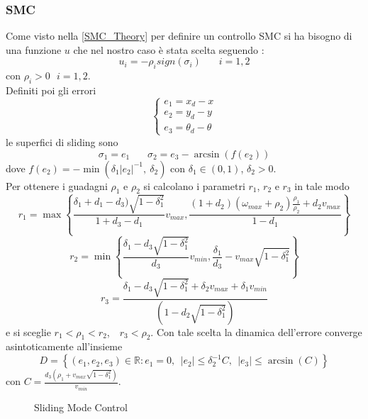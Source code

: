 \subsubsection{SMC}
Come visto nella \autoref{SMC_Theory} per definire un controllo SMC si ha bisogno di una funzione $u$ che nel nostro caso è stata scelta seguendo \cite{algoSMC}: 
\begin{equation}
        u_i=-\rho_{i}sign(\sigma_i)\: \: \: \: \: \: \: \:i=1,2
\end{equation}
con $\rho_i>0 \: \: \:i=1,2$. \\
Definiti poi gli errori 
\begin{equation}
\begin{cases}
    e_1=x_d-x 
   \\
   e_2=y_d-y
   \\
   e_3=\theta_d-\theta
\end{cases} 
\end{equation}
le superfici di sliding sono
\begin{equation}
       \sigma_1=e_1 \ \ \ \ \ \ \ \ \sigma_2=e_3-\arcsin(f(e_2))
\end{equation} 
dove $f(e_2)=-\min({\delta_1|e_2|^{-1},\ \delta_2})$ con $\delta_1 \in (0,1)$, $\delta_2>0$.\\ Per ottenere i guadagni $\rho_1$ e $\rho_2$ si calcolano i parametri  $r_1$, $r_2$ e $r_3$ in tale modo
\begin{equation}
        r_1= \max\left\{\frac{\delta_1+d_1-d_3)\sqrt{1-\delta_1^{2}}}{1+d_3-d_1}v_{max}, \frac{(1+d_2)(\omega_{max}+\rho_2) \frac{\rho_1}{\rho_2}+d_2v_{max}}{1-d_1}\right\}
\end{equation}
\begin{equation}
        r_2= \min\left\{\frac{\delta_1-d_3\sqrt{1-\delta_1^{2}}}{d_3}v_{min}, \frac{\delta_1}{d_3}-v_{max}\sqrt{1-\delta_1^{2}}\right\}
\end{equation}
\begin{equation}
        r_3= \frac{\delta_1-d_3\sqrt{1-\delta_1^{2}}+\delta_2v_{max}+\delta_1v_{min}}{(1-d_2\sqrt{1-\delta_1^{2}})}
\end{equation}
e si sceglie $r_1<\rho_1<r_2$,\ \ $r_3<\rho_2$. Con tale scelta la dinamica dell'errore converge asintoticamente all'insieme
\begin{equation}
        D=\left\{(e_1,e_2,e_3) \in \mathbb{R}: e_1=0, \ \  |e_2|\le\delta_2^{-1}C, \ \ |e_3|\le \arcsin{(C)} \right\}
\end{equation}
con $C=\frac{d_3(\rho_1+v_{max}\sqrt{1-\delta_1^{2}})}{v_{min}}$.
\begin{figure} [H]
    \centering
    
    \caption{Sliding Mode Control}
    \label{fig:SMC}
\end{figure}


